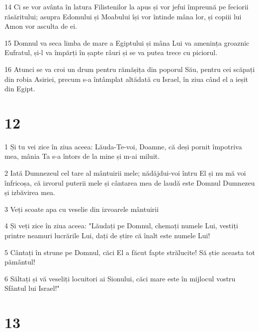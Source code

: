 \par 14 Ci se vor avânta în latura Filistenilor la apus și vor jefui împreună pe feciorii răsăritului; asupra Edomului și Moabului își vor întinde mâna lor, și copiii lui Amon vor asculta de ei.
\par 15 Domnul va seca limba de mare a Egiptului și mâna Lui va amenința groaznic Eufratul, și-l va împărți în șapte râuri și se va putea trece cu piciorul.
\par 16 Atunci se va croi un drum pentru rămășița din poporul Său, pentru cei scăpați din robia Asiriei, precum s-a întâmplat altădată cu Israel, în ziua când el a ieșit din Egipt.

\chapter{12}

\par 1 Și tu vei zice în ziua aceea: Lăuda-Te-voi, Doamne, că deși pornit împotriva mea, mânia Ta s-a întors de la mine și m-ai miluit.
\par 2 Iată Dumnezeul cel tare al mântuirii mele; nădăjdui-voi întru El și nu mă voi înfricoșa, că izvorul puterii mele și cântarea mea de laudă este Domnul Dumnezeu și izbăvirea mea.
\par 3 Veți scoate apa cu veselie din izvoarele mântuirii
\par 4 Și veți zice în ziua aceea: "Lăudați pe Domnul, chemați numele Lui, vestiți printre neamuri lucrările Lui, dați de știre că înalt este numele Lui!
\par 5 Cântați în strune pe Domnul, căci El a făcut fapte strălucite! Să știe aceasta tot pământul!
\par 6 Săltați și vă veseliți locuitori ai Sionului, căci mare este în mijlocul vostru Sfântul lui Israel!"

\chapter{13}

